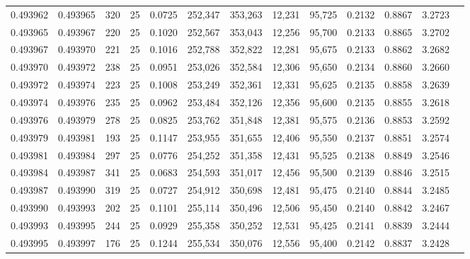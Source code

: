 \begin{tabular}{rrrrrrrrrrrrr}
0.493962 & 0.493965 &   320 &  25 &                                     0.0725 & 252,347 & 353,263 &  12,231 &  95,725 & 0.2132 & 0.8867 & 3.2723 \\
0.493965 & 0.493967 &   220 &  25 &                                     0.1020 & 252,567 & 353,043 &  12,256 &  95,700 & 0.2133 & 0.8865 & 3.2702 \\
0.493967 & 0.493970 &   221 &  25 &                                     0.1016 & 252,788 & 352,822 &  12,281 &  95,675 & 0.2133 & 0.8862 & 3.2682 \\
0.493970 & 0.493972 &   238 &  25 &                                     0.0951 & 253,026 & 352,584 &  12,306 &  95,650 & 0.2134 & 0.8860 & 3.2660 \\
0.493972 & 0.493974 &   223 &  25 &                                     0.1008 & 253,249 & 352,361 &  12,331 &  95,625 & 0.2135 & 0.8858 & 3.2639 \\
0.493974 & 0.493976 &   235 &  25 &                                     0.0962 & 253,484 & 352,126 &  12,356 &  95,600 & 0.2135 & 0.8855 & 3.2618 \\
0.493976 & 0.493979 &   278 &  25 &                                     0.0825 & 253,762 & 351,848 &  12,381 &  95,575 & 0.2136 & 0.8853 & 3.2592 \\
0.493979 & 0.493981 &   193 &  25 &                                     0.1147 & 253,955 & 351,655 &  12,406 &  95,550 & 0.2137 & 0.8851 & 3.2574 \\
0.493981 & 0.493984 &   297 &  25 &                                     0.0776 & 254,252 & 351,358 &  12,431 &  95,525 & 0.2138 & 0.8849 & 3.2546 \\
0.493984 & 0.493987 &   341 &  25 &                                     0.0683 & 254,593 & 351,017 &  12,456 &  95,500 & 0.2139 & 0.8846 & 3.2515 \\
0.493987 & 0.493990 &   319 &  25 &                                     0.0727 & 254,912 & 350,698 &  12,481 &  95,475 & 0.2140 & 0.8844 & 3.2485 \\
0.493990 & 0.493993 &   202 &  25 &                                     0.1101 & 255,114 & 350,496 &  12,506 &  95,450 & 0.2140 & 0.8842 & 3.2467 \\
0.493993 & 0.493995 &   244 &  25 &                                     0.0929 & 255,358 & 350,252 &  12,531 &  95,425 & 0.2141 & 0.8839 & 3.2444 \\
0.493995 & 0.493997 &   176 &  25 &                                     0.1244 & 255,534 & 350,076 &  12,556 &  95,400 & 0.2142 & 0.8837 & 3.2428 \\

\end{tabular}
